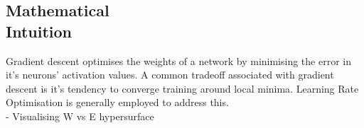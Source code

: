 \documentclass[12pt]{article}
\begin{document}
\begin{multicols}{2}
		\section{Mathematical \\Intuition}
		Gradient descent optimises the weights of a network by minimising the error in it's neurons' activation values. A common tradeoff associated with gradient descent is it's tendency to converge training around local minima. Learning Rate Optimisation is generally employed to address this.
		\\
		- Visualising W vs E hypersurface
		
	\end{multicols}

	\begin{multicols}{2}
		
	\end{multicols}
	
	
	
	
	
\end{document}
